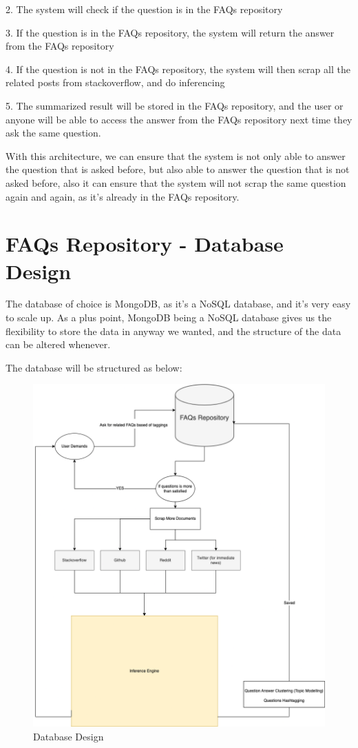 2. The system will check if the question is in the FAQs repository

3. If the question is in the FAQs repository, the system will return the answer from the FAQs repository

4. If the question is not in the FAQs repository, the system will then scrap all the related posts from stackoverflow, and do inferencing

5. The summarized result will be stored in the FAQs repository, and the user or anyone will be able to access the answer from the FAQs repository next time they ask the same question.

With this architecture, we can ensure that the system is not only able to answer the question that is asked before, but also able to answer the question that is not asked before, also it can ensure that the system will not scrap the same question again and again, as it's already in the FAQs repository.

\section{FAQs Repository - Database Design}
The database of choice is MongoDB, as it's a NoSQL database, and it's very easy to scale up. As a plus point, MongoDB being a NoSQL database gives us the flexibility to store the data in anyway we wanted, and the structure of the data can be altered whenever. 

The database will be structured as below:
\pagebreak
\begin{figure}[H]
  \centering
  \noindent \includegraphics[scale=0.50]{assets/faq_repo_workflow.png}
\caption{Database Design}\label{database_design}
\end{figure}

